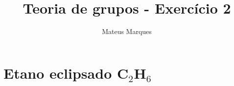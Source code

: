\documentclass[a4paper,10pt]{article}
\title{\Huge{\textbf{Teoria de grupos - Exercício 2}}}
\author{Mateus Marques}
\begin{document}
\maketitle

\section*{Etano eclipsado C$_2$H$_6$}
\end{document}
